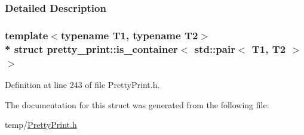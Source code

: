 \subsubsection{Detailed Description}
\subsubsection*{template$<$typename T1, typename T2$>$\\*
struct pretty\+\_\+print\+::is\+\_\+container$<$ std\+::pair$<$ T1, T2 $>$ $>$}



Definition at line 243 of file Pretty\+Print.\+h.



The documentation for this struct was generated from the following file\+:\begin{DoxyCompactItemize}
\item 
temp/\hyperlink{PrettyPrint_8h}{Pretty\+Print.\+h}\end{DoxyCompactItemize}
